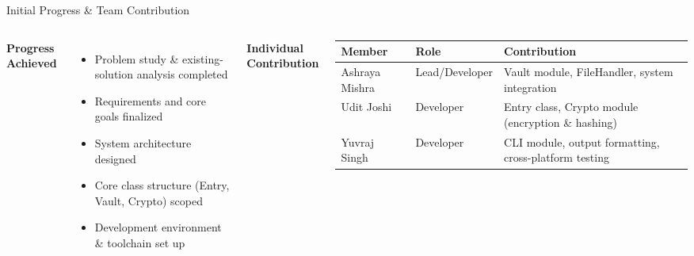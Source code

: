 \documentclass[aspectratio=169,11pt]{beamer}
\begin{document}
\begin{frame}{Initial Progress \& Team Contribution}
\begin{columns}[T,totalwidth=\textwidth]
\textbf{\color{GEUBlue}Progress Achieved}
\begin{itemize}\itemsep3pt
\item Problem study \& existing-solution analysis completed
\item Requirements and core goals finalized
\item System architecture designed
\item Core class structure (Entry, Vault, Crypto) scoped
\item Development environment \& toolchain set up
\end{itemize}
\textbf{\color{GEUBlue}Individual Contribution}
\vspace{2mm}
\scriptsize
\begin{tabularx}{\textwidth}{@{}p{2.3cm}p{2.0cm}X@{}}
\toprule
Member & Role & Contribution\\
\midrule
Ashraya Mishra & Lead/Developer & Vault module, FileHandler, system integration\\
Udit Joshi & Developer & Entry class, Crypto module (encryption \& hashing)\\
Yuvraj Singh & Developer & CLI module, output formatting, cross-platform testing\\
\bottomrule
\end{tabularx}
\end{columns}
\end{frame}
\end{document}
